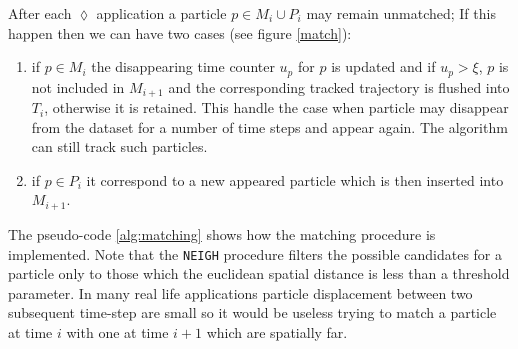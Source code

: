 \documentclass[conference]{IEEEtran}
\begin{document}
After each $\lozenge$ application a particle $p \in {M_i} \cup P_i $ may remain  unmatched; If this happen then we can have two cases (see figure \ref{match}):
\begin{enumerate}
 \item if $p \in M_{i}$ the disappearing time counter $u_p$ for $p$ is updated and if $u_p > \xi$, $p$ is not included in $M_{i+1}$ and the corresponding tracked trajectory is flushed into $T_i$, otherwise it is retained. This handle the case when particle may disappear from the dataset for a number of time steps and  appear again. The algorithm can still track such particles.
 \item if $p \in P_i$ it correspond to a new appeared particle which is then inserted into $M_{i+1}$. 
\end{enumerate}
 
The pseudo-code \ref{alg:matching} shows how the matching procedure is implemented. Note that the \texttt{NEIGH} procedure filters the possible candidates for a particle only to those which the euclidean spatial distance is less than a threshold parameter. In many real life applications particle displacement between two subsequent time-step are small so it would be useless trying to match a particle at time $i$ with one at time $i+1$ which are spatially far.
%
\end{document}
